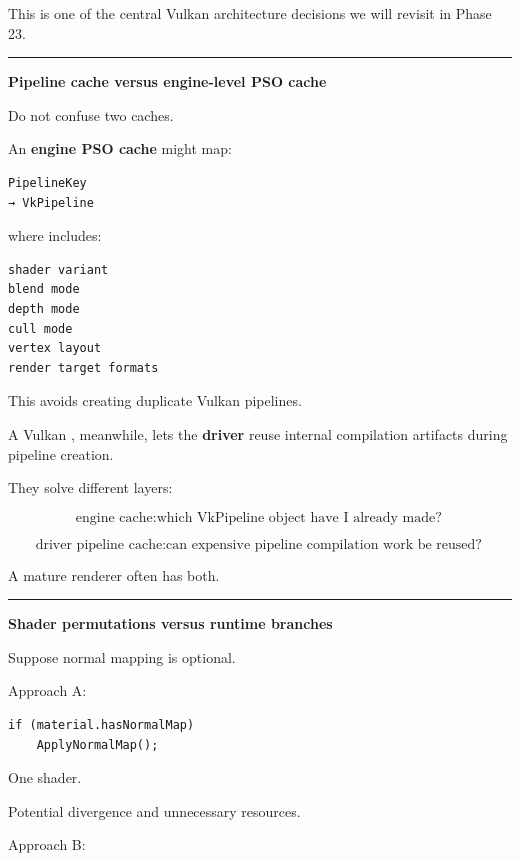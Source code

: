 This is one of the central Vulkan architecture decisions we will revisit in Phase 23.

\begin{center}\rule{0.5\linewidth}{0.5pt}\end{center}

\textbf{Pipeline cache versus engine-level PSO cache}

Do not confuse two caches.

An \textbf{engine PSO cache} might map:

\begin{verbatim}
PipelineKey
→ VkPipeline
\end{verbatim}

where  includes:

\begin{verbatim}
shader variant
blend mode
depth mode
cull mode
vertex layout
render target formats
\end{verbatim}

This avoids creating duplicate Vulkan pipelines.

A Vulkan , meanwhile, lets the \textbf{driver} reuse internal compilation artifacts during pipeline creation.

They solve different layers:

\[
\boxed{
\text{engine cache}
:
\text{which VkPipeline object have I already made?}
}
\]

\[
\boxed{
\text{driver pipeline cache}
:
\text{can expensive pipeline compilation work be reused?}
}
\]

A mature renderer often has both.

\begin{center}\rule{0.5\linewidth}{0.5pt}\end{center}

\textbf{Shader permutations versus runtime branches}

Suppose normal mapping is optional.

Approach A:

\begin{verbatim}
if (material.hasNormalMap)
    ApplyNormalMap();
\end{verbatim}

One shader.

Potential divergence and unnecessary resources.

Approach B:

